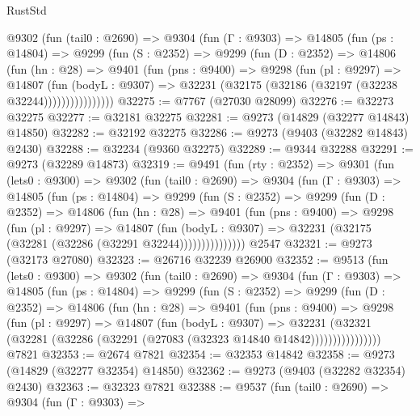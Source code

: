 \begin{lexlean}{RustStd}
\begin{coremodule}
        @9302
          (fun (tail0 : @2690) =>
          @9304
            (fun (Γ : @9303) =>
            @14805
              (fun (ps : @14804) =>
              @9299
                (fun (S : @2352) =>
                @9299
                  (fun (D : @2352) =>
                  @14806
                    (fun (hn : @28) =>
                    @9401
                      (fun (pns : @9400) =>
                      @9298
                        (fun (pl : @9297) =>
                        @14807
                          (fun (bodyL : @9307) =>
                          @32231 (@32175 (@32186 (@32197 (@32238 @32244))))))))))))))))
@32275 := @7767 (@27030 @28099)
@32276 := @32273 @32275
@32277 := @32181 @32275
@32281 := @9273 (@14829 (@32277 @14843) @14850)
@32282 := @32192 @32275
@32286 := @9273 (@9403 (@32282 @14843) @2430)
@32288 := @32234 (@9360 @32275)
@32289 := @9344 @32288
@32291 := @9273 (@32289 @14873)
@32319 := @9491
    (fun (rty : @2352) =>
    @9301
      (fun (lets0 : @9300) =>
      @9302
        (fun (tail0 : @2690) =>
        @9304
          (fun (Γ : @9303) =>
          @14805
            (fun (ps : @14804) =>
            @9299
              (fun (S : @2352) =>
              @9299
                (fun (D : @2352) =>
                @14806
                  (fun (hn : @28) =>
                  @9401
                    (fun (pns : @9400) =>
                    @9298
                      (fun (pl : @9297) =>
                      @14807
                        (fun (bodyL : @9307) =>
                        @32231 (@32175 (@32281 (@32286 (@32291 @32244)))))))))))))))
    @2547
@32321 := @9273 (@32173 @27080)
@32323 := @26716 @32239 @26900
@32352 := @9513
    (fun (lets0 : @9300) =>
    @9302
      (fun (tail0 : @2690) =>
      @9304
        (fun (Γ : @9303) =>
        @14805
          (fun (ps : @14804) =>
          @9299
            (fun (S : @2352) =>
            @9299
              (fun (D : @2352) =>
              @14806
                (fun (hn : @28) =>
                @9401
                  (fun (pns : @9400) =>
                  @9298
                    (fun (pl : @9297) =>
                    @14807
                      (fun (bodyL : @9307) =>
                      @32231
                        (@32321
                          (@32281 (@32286 (@32291 (@27083 (@32323 @14840 @14842))))))))))))))))
    @7821
@32353 := @2674 @7821
@32354 := @32353 @14842
@32358 := @9273 (@14829 (@32277 @32354) @14850)
@32362 := @9273 (@9403 (@32282 @32354) @2430)
@32363 := @32323 @7821
@32388 := @9537
    (fun (tail0 : @2690) =>
    @9304
      (fun (Γ : @9303) =>

\end{coremodule}
\end{lexlean}
